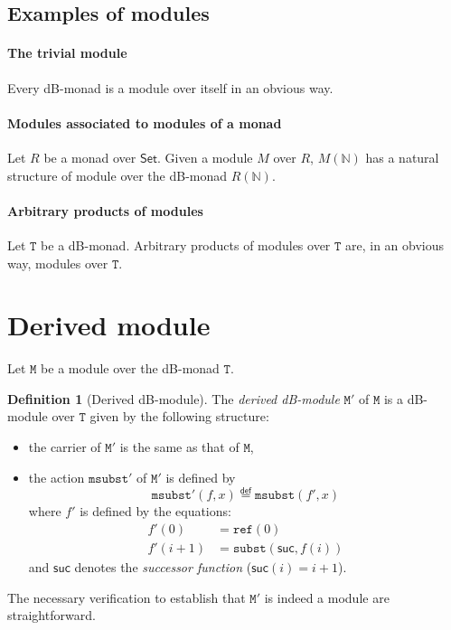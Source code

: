 \documentclass[a4paper,twoside,12pt]{article}
\theoremstyle{definition}
\newtheorem{definition}{Definition}
\theoremstyle{remark}
\newcommand{\NN}{\mathbb{N}}
\newcommand{\subst}{\mathtt{subst}}
\newcommand{\refe}{\mathtt{ref}}
\newcommand{\TT}{\mathtt{T}}
\newcommand{\MM}{\mathtt{M}}
\newcommand{\msubst}{\mathtt{msubst}}
\begin{document}
\subsection{Examples of modules}
\label{sec:examples-modules}

\paragraph{The trivial module}

Every dB-monad is a module over itself in an obvious way.

\paragraph{Modules associated to modules of a monad}

Let $R$ be a monad over $\mathsf{Set}$.  Given a module $M$ over $R$,
$M(\NN)$ has a natural structure of module over the dB-monad $R(\NN)$.

\paragraph{Arbitrary products of modules}

Let $\TT$ be a dB-monad.  Arbitrary products of modules over $\TT$
are, in an obvious way, modules over $\TT$.

\section{Derived module}
\label{sec:derived-module}

Let $\MM$ be a module over the dB-monad $\TT$.

\begin{definition}[Derived dB-module]
  The \emph{derived dB-module} $\MM'$ of $\MM$ is a dB-module over
  $\TT$ given by the following structure:
  \begin{itemize}
  \item the carrier of $\MM'$ is the same as that of $\MM$,
  \item the action $\msubst'$ of $\MM'$ is defined by
    \begin{equation*}
    \msubst'(f,x) \stackrel{\mathsf{def}}{=} \msubst(f',x)
  \end{equation*}
  where $f'$ is defined by the equations:
  \begin{align*}
    f'(0) &= \refe(0)\\
    f'(i+1) &= \subst(\mathsf{suc},f(i))
  \end{align*}
  and $\mathsf{suc}$ denotes the \emph{successor function}
  ($\mathsf{suc}(i) = i+1$).
  \end{itemize}
\end{definition}

The necessary verification to establish that $\MM'$ is indeed a module
are straightforward.
\end{document}
